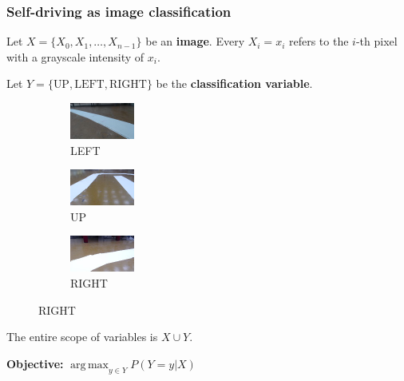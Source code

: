 \documentclass{beamer}
\DeclareMathOperator*{\argmax}{arg\,max}
\newcommand{\Left}{\text{LEFT}}
\newcommand{\Right}{\text{RIGHT}}
\newcommand{\Up}{\text{UP}}
\begin{document}
\begin{frame}
  \frametitle{Self-driving as image classification}

  Let $X=\{X_0,X_1,\ldots,X_{n-1}\}$ be an \textbf{image}. Every $X_i=x_i$ refers to the $i$-th
  pixel with a grayscale intensity of $x_i$.

  Let $Y=\{\Up,\Left,\Right\}$ be the \textbf{classification variable}.

  \begin{figure}
    \begin{subfigure}{0.3\linewidth}
      \centering\includegraphics{imgs/sample_left.png}
      \captionsetup{justification=centering}
      \caption*{LEFT}
    \end{subfigure}
    \begin{subfigure}{0.3\linewidth}
      \centering\includegraphics{imgs/sample_up.png}
      \captionsetup{justification=centering}
      \caption*{UP}
    \end{subfigure}
    \begin{subfigure}{0.3\linewidth}
      \centering\includegraphics{imgs/sample_right.png}
      \captionsetup{justification=centering}
      \caption*{RIGHT}
    \end{subfigure}
  \end{figure}

  The entire scope of variables is $X\cup Y$.

  \vfill\centering\textbf{Objective:} $\argmax_{y\in Y} P(Y=y|X)$
\end{frame}
\end{document}
